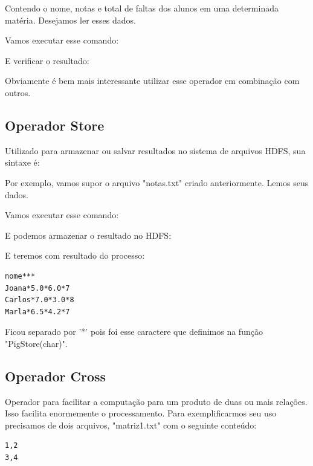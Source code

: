 \documentclass[a4paper,11pt]{article}
\begin{document}
Contendo o nome, notas e total de faltas dos alunos em uma determinada matéria. Desejamos ler esses dados. \\

Vamos executar esse comando: \\

E verificar o resultado: \\

Obviamente é bem mais interessante utilizar esse operador em combinação com outros.

\subsection{Operador Store}
Utilizado para armazenar ou salvar resultados no sistema de arquivos HDFS, sua sintaxe é: \\

Por exemplo, vamos supor o arquivo "notas.txt" criado anteriormente. Lemos seus dados. \\

Vamos executar esse comando: \\

E podemos armazenar o resultado no HDFS: \\

E teremos com resultado do processo:
\begin{lstlisting}[]
nome***
Joana*5.0*6.0*7
Carlos*7.0*3.0*8
Marla*6.5*4.2*7
\end{lstlisting}

Ficou separado por '*' pois foi esse caractere que definimos na função "PigStore(char)".

\subsection{Operador Cross}
Operador para facilitar a computação para um produto de duas ou mais relações. Isso facilita enormemente o processamento. Para exemplificarmos seu uso precisamos de dois arquivos, "matriz1.txt" com o seguinte conteúdo:
\begin{lstlisting}[]
1,2
3,4
\end{lstlisting}
\end{document}
